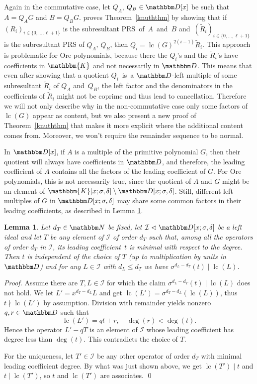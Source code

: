 \documentclass[3p,11pt,preprint]{elsarticle}
\newtheorem{lemma}{Lemma}
\let\set\mathbbm
\def\k{\set D}
\newcommand{\qk}{\set{K}}
\newcommand{\D}{x}
\newcommand{\alg}{\k[\D;\sigma,\delta]}
\newcommand{\qalg}{\qk[\D;\sigma,\delta]}
\newcommand{\lc}{\operatorname{lc}}
\newcommand{\prs}[3]{(#1_i)_{i\in \{#2,\dots,#3\}}}
\begin{document}
Again in the commutative case, let $Q_A$, $Q_B \in\k[\D]$ be such that $A=Q_AG$ and $B=Q_BG$. \cite{knuth} proves Theorem~\ref{knuththm} by showing that if $\prs{R}{0}{\ell+1}$ is the subresultant PRS~of~$A$~and~$B$ and~$\prs{\tilde{R}}{0}{\ell+1}$ is the subresultant PRS of $Q_A$, $Q_B$, then $Q_i = \lc(G)^{2(i-1)}\tilde{R}_i$. This approach is problematic for Ore polynomials, because there the $Q_i$'s and the $\tilde{R}_i$'s have coefficients in $\qk$ and not necessarily in $\k$. This means that even after showing that a quotient $Q_i$~is~a $\k$-left multiple of some subresultant $\tilde{R}_i$ of $Q_A$ and~$Q_B$, the left factor and the denominators in the coefficients of $\tilde{R}_i$ might not be coprime and thus lead to cancellation. Therefore we will not only describe why in the non-commutative case only some factors of $\lc(G)$ appear as content, but we also present a new proof of Theorem~\ref{knuththm} that makes it more explicit where the additional content comes from. Moreover, we won't require the 
remainder sequence to be normal. 

In $\k[x]$, if $A$ is a multiple of the primitive polynomial $G$, then their quotient will always have coefficients in $\k$, and therefore, the leading coefficient of $A$ contains all the factors of the leading coefficient of $G$. For Ore polynomials, this is not necessarily true, since the quotient of $A$ and $G$ might be an element of $\qalg\setminus\alg$. Still, different left multiples of $G$ in $\alg$ may share some common factors in their leading coefficients, as described in Lemma \ref{lcthm}.

\begin{lemma}
\label{lcthm}
 Let $d_T\in\set N$ be fixed, let $\mathcal{I}\vartriangleleft\alg$  be a left ideal and let $T$ be any element of $\mathcal{I}$ of order $d_T$ such that, among all the operators of order $d_T$ in $\mathcal{I}$, its leading coefficient~$t$ is minimal with respect to the degree. Then $t$ is independent of the choice of $T$ (up to multiplication by units in $\set D$) and for any $L\in \mathcal{I}$ with $d_L\leq d_T$ we have $\sigma^{d_L-d_T}(t)\mid\lc(L)$. 
\end{lemma}
\begin{proof}
 Assume there are $T,L\in \mathcal{I}$ for which the claim $\sigma^{d_L-d_T}(t)\mid\lc(L)$ does not hold.
 We let $L' =\D^{d_T-d_L}L$ and get $\lc(L') = \sigma^{d_T-d_L}(\lc(L))$, thus $t\nmid\lc(L')$ by assumption.
 Division with remainder yields nonzero $q,r\in \k$ such that \[\lc(L') = qt+r,\quad \deg(r)<\deg(t).\]
 Hence the operator $L'-qT$ is an element of $\mathcal{I}$ whose leading coefficient has degree less than $\deg(t)$. This contradicts the choice of $T$.

\noindent For the uniqueness, let $T'\in \mathcal{I}$ be any other operator of order $d_T$ with minimal leading \mbox{coefficient} degree. By what was just shown above, we get $\lc(T')\mid t$ and $t\mid\lc(T')$, so $t$ and $\lc(T')$ are associates.
\qed
\end{proof}
\end{document}
